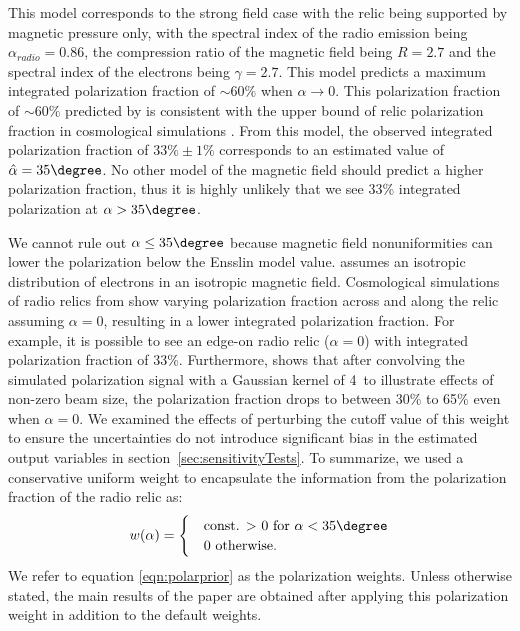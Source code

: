 This model corresponds to the strong field case with the relic being supported by
magnetic pressure only, with the spectral index of the radio
emission being $\alpha_{radio} = 0.86$, the compression ratio of the
magnetic field being
$R=2.7$ and the spectral index of the electrons being $\gamma = 2.7$. 
This model predicts a maximum integrated polarization fraction of
$\sim60\%$ when $\alpha \rightarrow 0$. 
This  polarization fraction of $\sim60\%$ predicted by \citep{E98} is
consistent with the upper bound of relic polarization fraction in cosmological
simulations \citep{S13}. From this model, the
observed integrated polarization fraction of $33\%\pm1\%$ corresponds to an estimated value
of $\hat{\alpha}  = 35\degree$. 
No other model of the magnetic field should predict 
a higher polarization fraction, thus it is highly unlikely that we see 33\%
integrated polarization at $\alpha > 35\degree$.  
\par

We cannot rule out $\alpha \leq 35\degree$ because magnetic field
nonuniformities can lower the polarization below the Ensslin model value.
\cite{E98} assumes an isotropic distribution of electrons in an isotropic magnetic field. Cosmological
simulations of radio relics from \cite{S13} show varying polarization
fraction across and along the relic assuming $\alpha = 0$, resulting in a
lower integrated polarization fraction. For example, it is possible to see 
an edge-on radio relic ($\alpha = 0$) with integrated polarization fraction of 33\%. 
Furthermore, \cite{S13} shows that after convolving the
simulated polarization signal with a Gaussian kernel of 4\arcmin~to
illustrate effects of non-zero beam size, the polarization fraction drops
to between 30\% to 65\% even when $\alpha = 0$. We examined the effects of perturbing
the cutoff value of this weight to ensure the uncertainties do not
introduce significant bias in the estimated output variables in
section~\ref{sec:sensitivityTests}.
To summarize, we used a conservative uniform weight to encapsulate the
information from the polarization fraction of the radio relic as:
\begin{equation}
w(\alpha) = 
	\begin{cases}
	& \text{const. $>$ 0 for  }\alpha < 35 \degree \\ 
	& 0 \text{ otherwise}\label{eqn:polarprior}.
	\end{cases}
\end{equation}
We refer to equation \ref{eqn:polarprior} as the polarization weights. Unless
otherwise stated, the main results of the paper are obtained after applying
this polarization weight in addition to the default weights.


